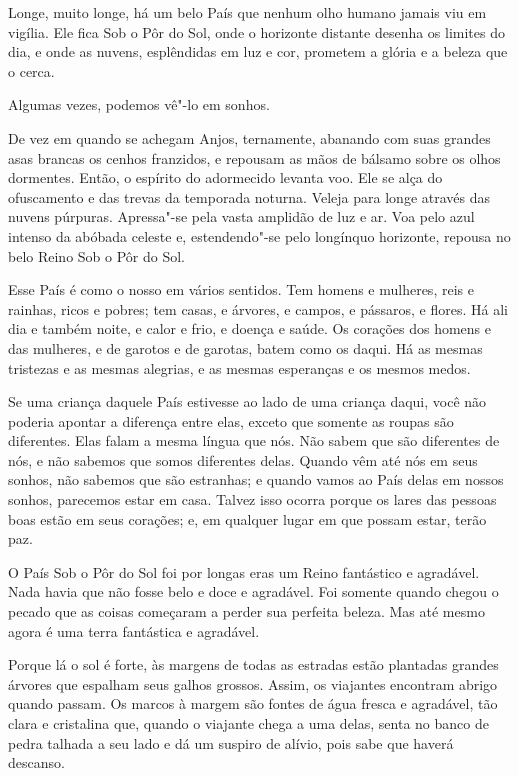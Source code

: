  

Longe, muito longe, há um belo País que nenhum olho humano jamais viu
em vigília. Ele fica Sob o Pôr do Sol, onde o horizonte distante desenha
os limites do dia, e onde as nuvens, esplêndidas em luz e cor, prometem
a glória e a beleza que o cerca.

Algumas vezes, podemos vê"-lo em sonhos.

De vez em quando se achegam Anjos, ternamente, abanando com suas grandes
asas brancas os cenhos franzidos, e repousam as mãos de bálsamo sobre os
olhos dormentes. Então, o espírito do adormecido levanta voo. Ele se alça do
ofuscamento e das trevas da temporada noturna. Veleja para longe
através das nuvens púrpuras. Apressa"-se pela vasta amplidão de
luz e ar. Voa pelo azul intenso da abóbada celeste e, estendendo"-se pelo
longínquo horizonte, repousa no belo Reino Sob o Pôr do Sol.

Esse País é como o nosso em vários sentidos. Tem homens e mulheres,
reis e rainhas, ricos e pobres; tem casas, e árvores, e campos, e
pássaros, e flores. Há ali dia e também noite, e calor e frio, e doença
e saúde. Os corações dos homens e das mulheres, e de garotos e de garotas,
batem como os daqui. Há as mesmas tristezas e as mesmas alegrias, e as
mesmas esperanças e os mesmos medos.

Se uma criança daquele País estivesse ao lado de uma criança daqui, você
não poderia apontar a diferença entre elas, exceto que somente as roupas
são diferentes. Elas falam a mesma língua que nós. Não sabem que
são diferentes de nós, e não sabemos que somos diferentes delas. Quando
vêm até nós em seus sonhos, não sabemos que são estranhas; e quando
vamos ao País delas em nossos sonhos, parecemos estar em casa. Talvez
isso ocorra porque os lares das pessoas boas estão em seus corações; e,
em qualquer lugar em que possam estar, terão paz.

O País Sob o Pôr do Sol foi por longas eras um Reino fantástico e
agradável. Nada havia que não fosse belo e doce e agradável. Foi somente
quando chegou o pecado que as coisas começaram a perder sua perfeita
beleza. Mas até mesmo agora é uma terra fantástica e agradável.

Porque lá o sol é forte, às margens de todas as estradas estão plantadas
grandes árvores que espalham seus galhos grossos. Assim, os viajantes
encontram abrigo quando passam. Os marcos à margem são fontes de água fresca e
agradável, tão clara e cristalina que, quando o viajante chega a uma
delas, senta no banco de pedra talhada a seu lado e dá um suspiro de
alívio, pois sabe que haverá descanso.

